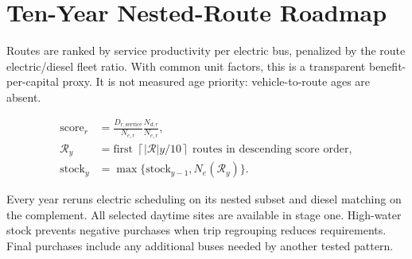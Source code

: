 
\section{Ten-Year Nested-Route Roadmap}

Routes are ranked by service productivity per electric bus, penalized by the route electric/diesel fleet ratio. With common unit factors, this is a transparent benefit-per-capital proxy. It is not measured age priority: vehicle-to-route ages are absent.


\begin{align}
\mathrm{score}_r&=\frac{D_{r,\mathrm{service}}}{N_{e,r}}
                         \frac{N_{d,r}}{N_{e,r}},\\
\mathcal R_y&=\text{first }\left\lceil |\mathcal R|y/10\right\rceil
                           \text{ routes in descending score order},\\
\mathrm{stock}_y&=\max\{\mathrm{stock}_{y-1},N_e(\mathcal R_y)\}.
\end{align}

Every year reruns electric scheduling on its nested subset and diesel matching on the complement. All selected daytime sites are available in stage one. High-water stock prevents negative purchases when trip regrouping reduces requirements. Final purchases include any additional buses needed by another tested pattern.


